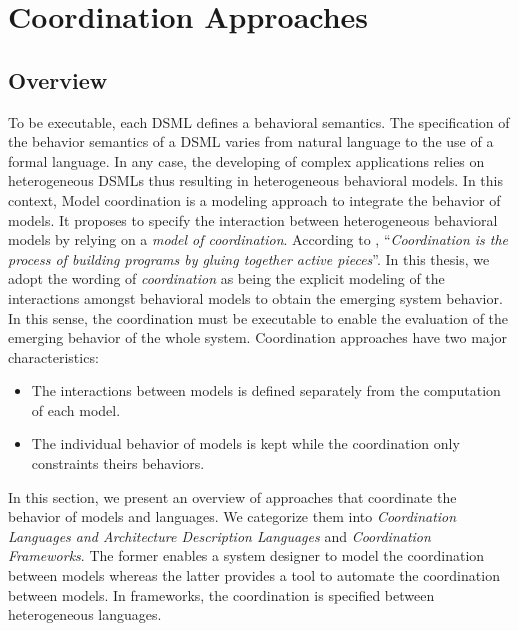 \section{Coordination Approaches}
\subsection{Overview}
To be executable, each DSML defines a behavioral semantics. The specification of the behavior semantics of a DSML varies from natural language to the use of a formal language. In any case, the developing of complex applications relies on heterogeneous DSMLs thus resulting in heterogeneous behavioral models. In this context, Model coordination is a modeling approach to integrate the behavior of models. It proposes to specify the interaction between heterogeneous behavioral models by relying on a \emph{model of coordination}. According to \cite{coordsignibib}, ``\textit{Coordination is the process of building programs by gluing together active pieces}''. In this thesis, we adopt the wording of \emph{coordination} as being the explicit modeling of the interactions amongst behavioral models to obtain the emerging system behavior. In this sense, the coordination must be executable to enable the evaluation of the emerging behavior of the whole system. 
Coordination approaches have two major characteristics:
\begin{itemize}
	\item The interactions between models is defined separately from the computation of each model. 
	\item The individual behavior of models is kept while the coordination only constraints theirs behaviors. 
\end{itemize}
In this section, we present an overview of approaches that coordinate the behavior of models and languages. We categorize them into \emph{Coordination Languages and Architecture Description Languages} and \emph{Coordination Frameworks}. The former enables a system designer to model the coordination between models whereas the latter provides a tool to automate the coordination between models. In frameworks, the coordination is specified between heterogeneous languages.

